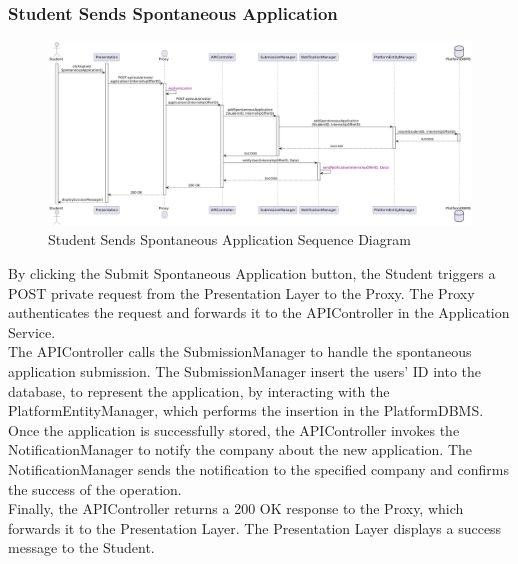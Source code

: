 
\subsubsection*{Student Sends Spontaneous Application}
\begin{figure}[H]
    \centering
    \includegraphics[width=\linewidth]{Latex/Images/DD/SequenceDiagrams/7StudentSendsSpontaneousApplication.png}
    \caption{Student Sends Spontaneous Application Sequence Diagram}
    \label{fig:studsendspontapp}
\end{figure}
By clicking the Submit Spontaneous Application button, the Student triggers a POST private request from the Presentation Layer to the Proxy. The Proxy authenticates the request and forwards it to the APIController in the Application Service.\\
The APIController calls the SubmissionManager to handle the spontaneous application submission. The SubmissionManager insert the users' ID into the database, to represent the application, by interacting with the PlatformEntityManager, which performs the insertion in the PlatformDBMS.\\
Once the application is successfully stored, the APIController invokes the NotificationManager to notify the company about the new application. The NotificationManager sends the notification to the specified company and confirms the success of the operation.\\
Finally, the APIController returns a 200 OK response to the Proxy, which forwards it to the Presentation Layer. The Presentation Layer displays a success message to the Student.

